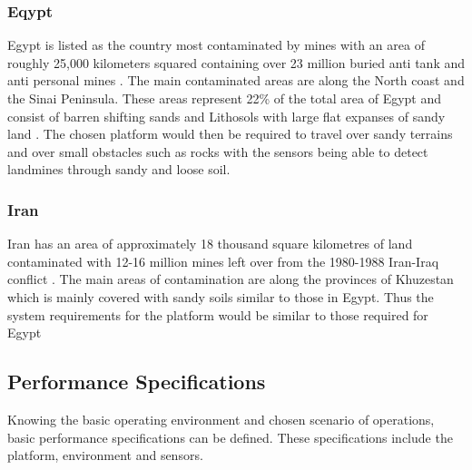\documentclass[main.tex]{subfiles}
\begin{document}
\subsubsection{Eqypt}
Egypt is listed as the country most contaminated by mines with an area of roughly 25,000 kilometers squared containing over 23 million buried anti tank and anti personal mines \parencite{Rushfan2008}. The main contaminated areas are along the North coast and the Sinai Peninsula. These areas represent 22\% of the total area of Egypt and consist of barren shifting sands and Lithosols with large flat expanses of sandy land \parencite{Nahrawy2011}. 
 The chosen platform would then be required to travel over sandy terrains and over small obstacles such as rocks with the sensors being able to detect landmines through sandy and loose soil. 
 \subsubsection{Iran}
 Iran has an area of approximately 18 thousand square kilometres of land contaminated with 12-16 million mines left over from the 1980-1988 Iran-Iraq conflict \parencite{landmineMonitor2015}. The main areas of contamination are along the provinces of Khuzestan which is mainly covered with sandy soils similar to those in Egypt. Thus the system requirements for the platform would be similar to those required for Egypt
\subsection{Performance Specifications}
 Knowing the basic operating environment and chosen scenario of operations, basic performance specifications can be defined. These specifications include the platform, environment and sensors.
\end{document}
